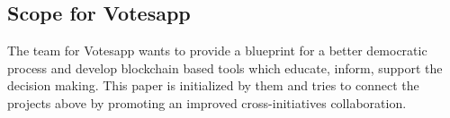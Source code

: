 \documentclass[9pt,oneside]{amsart}
\begin{document}
\begin{multicols}{2}

\subsection{Scope for Votesapp}
The team for Votesapp wants to provide a blueprint for a better democratic process and develop blockchain based tools which educate, inform, support the decision making. This paper is initialized by them and tries to connect the projects above by promoting an improved cross-initiatives collaboration.


\end{multicols}
\end{document}
